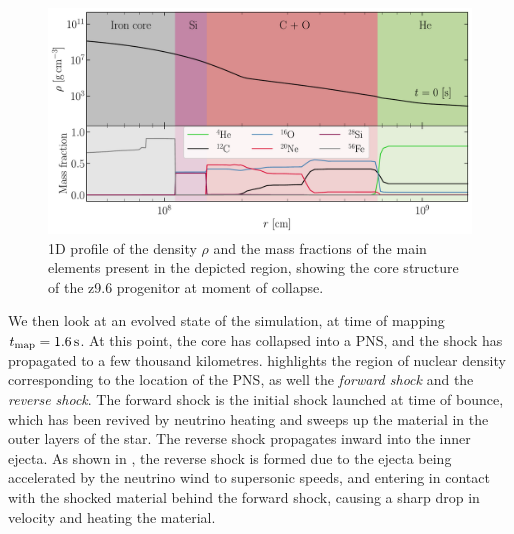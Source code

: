 \begin{figure}[ht!]
    \centering
    \includegraphics[width=1.0\linewidth]{figures/composition_1d.pdf}
    \caption{1D profile of the density \(\rho\) and the mass fractions of the main elements present in the depicted region, showing the core structure of the z9.6 progenitor at moment of collapse.}
    \label{fig:z96_composition}
\end{figure}

We then look at an evolved state of the simulation, at time of mapping \(t_\mathrm{map} = 1.6\,\mathrm{s}\). At this point, the core has collapsed into a PNS, and the shock has propagated to a few thousand kilometres.  highlights the region of nuclear density corresponding to the location of the PNS, as well the \emph{forward shock} and the \emph{reverse shock}. The forward shock is the initial shock launched at time of bounce, which has been revived by neutrino heating and sweeps up the material in the outer layers of the star. The reverse shock propagates inward into the inner ejecta. As shown in , the reverse shock is formed due to the ejecta being accelerated by the neutrino wind to supersonic speeds, and entering in contact with the shocked material behind the forward shock, causing a sharp drop in velocity and heating the material.


